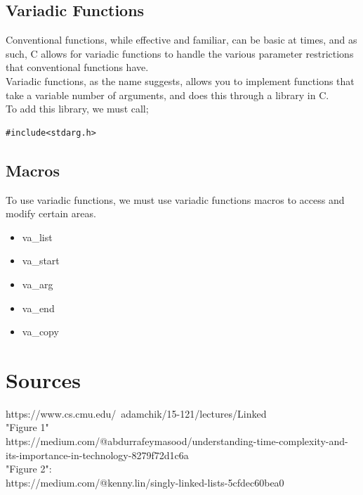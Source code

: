 \documentclass[hidelinks,11pt]{article}
\begin{document}
\subsection{Variadic Functions}
Conventional functions, while effective and familiar, can be basic at times, and as such, C allows for variadic functions to handle the various parameter restrictions that conventional functions have.\\[0.5\baselineskip]
Variadic functions, as the name suggests, allows you to implement functions that take a variable number of arguments, and does this through a library in C. \\[0.5\baselineskip]
To add this library, we must call;
\begin{lstlisting}[belowskip=-1.80 \baselineskip]
    #include<stdarg.h>
\end{lstlisting}
\subsection{Macros}
To use variadic functions, we must use variadic functions macros to access and modify certain areas.
\begin{itemize}
    \item va\_list
    \item va\_start
    \item va\_arg
    \item va\_end
    \item va\_copy
\end{itemize}

\section{Sources}
https://www.cs.cmu.edu/~adamchik/15-121/lectures/Linked%
\\[0.5\baselineskip]
"Figure 1"\\
https://medium.com/@abdurrafeymasood/understanding-time-complexity-and-its-importance-in-technology-8279f72d1c6a
\\[0.5\baselineskip]
"Figure 2":\\
https://medium.com/@kenny.lin/singly-linked-lists-5cfdec60bea0
\\
\end{document}
